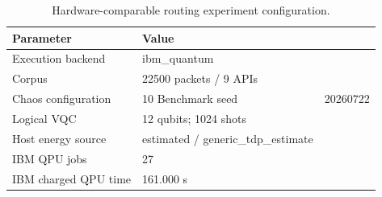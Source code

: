 \begin{table}[htbp]
\caption{Hardware-comparable routing experiment configuration.}
\label{tab:routing-experiment-configuration}
\centering
\begin{tabular}{ll}
\hline
Parameter & Value \\
\hline
Execution backend & ibm\_quantum \\
Corpus & 22500 packets / 9 APIs \\
Chaos configuration & 10%
Benchmark seed & 20260722 \\
Logical VQC & 12 qubits; 1024 shots \\
Host energy source & estimated / generic\_tdp\_estimate \\
IBM QPU jobs & 27 \\
IBM charged QPU time & 161.000 s \\
\hline
\end{tabular}
\end{table}
